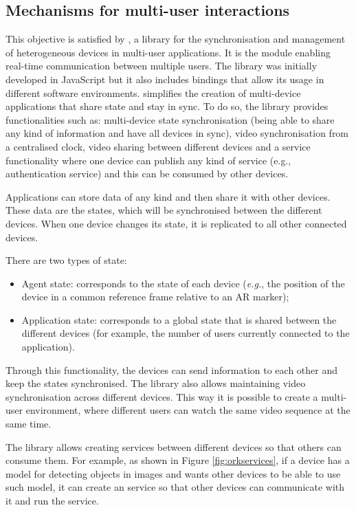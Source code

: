 \subsection{Mechanisms for multi-user interactions}\label{sec:architecture:multiuser}

This objective is satisfied by \ork{} \citep{10.1007/978-3-030-93907-6_106}, a library for the synchronisation and management of heterogeneous devices in multi-user applications. It is the module enabling real-time communication between multiple users. The library was initially developed in JavaScript but it also includes bindings that allow its usage in different software environments.
\ork{} simplifies the creation of multi-device applications that share state and stay in sync. To do so, the library provides functionalities such as: multi-device state synchronisation (being able to share any kind of information and have all devices in sync), video synchronisation from a centralised clock, video sharing between different devices and a service functionality where one device can publish any kind of service (e.g., authentication service) and this can be consumed by other devices.

Applications can store data of any kind and then share it with other devices. These data are the states, which will be synchronised between the different devices. When one device changes its state, it is replicated to all other connected devices.

There are two types of state:
\begin{itemize}
    \item Agent state: corresponds to the state of each device (\textit{e.g.}, the position of the device in a common reference frame relative to an AR marker);
    \item Application state: corresponds to a global state that is shared between the different devices (for example, the number of users currently connected to the application).
\end{itemize}

Through this functionality, the devices can send information to each other and keep the states synchronised. The library also allows maintaining video  synchronisation across different devices. This way it is possible to create a multi-user environment, where different users can watch the same video sequence at the same time. 

The library allows creating services between different devices so that others can consume them. For example, as shown in Figure \ref{fig:orkservices}, if a device has a model for detecting objects in images and wants other devices to be able to use such model, it can create an \ork{} service so that other devices can communicate with it and run the service.

